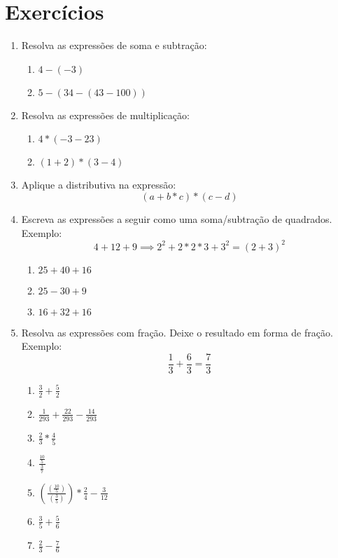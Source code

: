 \documentclass{article}
\begin{document}
\section{Exercícios}
\begin{enumerate}
	\item Resolva as expressões de soma e subtração:
	\begin{enumerate}
		\item $4 - (-3)$
		\item $5 - (34 - (43 - 100))$ 
	\end{enumerate}

	\item Resolva as expressões de multiplicação:
	\begin{enumerate}
		\item $4 * (-3 -23)$
		\item $(1 + 2)*(3-4)$
	\end{enumerate}
	
	\item Aplique a distributiva na expressão:
	$$(a + b*c)*(c - d)$$

	\item Escreva as expressões a seguir como uma soma/subtração de quadrados.
	Exemplo:
	$$4 + 12 + 9 \implies 2^2 + 2*2*3 + 3^2 = {(2+3)}^2$$
	\begin{enumerate}
		\item $25 + 40 + 16$
		\item $25 - 30 + 9$
		\item $16 + 32 + 16$
	\end{enumerate}

	\item Resolva as expressões com fração. 
	Deixe o resultado em forma de fração. Exemplo:
	$$\frac{1}{3} + \frac{6}{3} = \frac{7}{3}$$
	\begin{enumerate}
		\item $\frac{3}{2} + \frac{5}{2}$	
		\item $\frac{1}{293} + \frac{22}{293} - \frac{14}{293}$
		\item $\frac{2}{3} * \frac{4}{5}$
		\item $\frac{\frac{10}{5}}{\frac{3}{7}}$
		\item $(\frac{(\frac{10}{5})}{(\frac{3}{5})}) * 
		\frac{2}{4} - \frac{3}{12}$
		\item $\frac{3}{5} + \frac{5}{6}$
		\item $\frac{2}{3} - \frac{7}{6}$
	\end{enumerate}
\end{enumerate}
\end{document}
